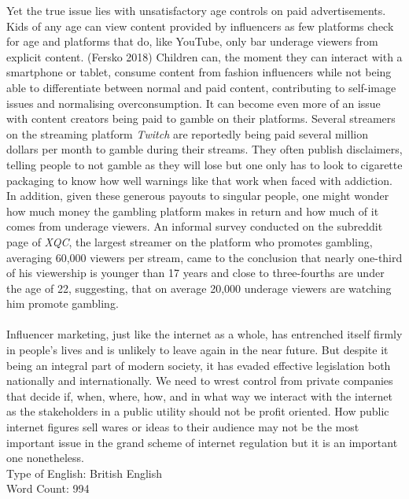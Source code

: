\documentclass{article}
\begin{document}
	Yet the true issue lies with unsatisfactory age controls on paid advertisements. Kids of any age can view content provided by influencers as few platforms check for age and platforms that do, like YouTube, only bar underage viewers from explicit content. (Fersko 2018) Children can, the moment they can interact with a smartphone or tablet, consume content from fashion influencers while not being able to differentiate between normal and paid content, contributing to self-image issues and normalising overconsumption. It can become even more of an issue with content creators being paid to gamble on their platforms. Several streamers on the streaming platform \textit{Twitch} are reportedly being paid several million dollars per month to gamble during their streams. They often publish disclaimers, telling people to not gamble as they will lose but one only has to look to cigarette packaging to know how well warnings like that work when faced with addiction. In addition, given these generous payouts to singular people, one might wonder how much money the gambling platform makes in return and how much of it comes from underage viewers. An informal survey conducted on the subreddit page of \textit{XQC}, the largest streamer on the platform who promotes gambling, averaging 60,000 viewers per stream, came to the conclusion that nearly one-third of his viewership is younger than 17 years and close to three-fourths are under the age of 22, suggesting, that on average 20,000 underage viewers are watching him promote gambling. \\ \\

	Influencer marketing, just like the internet as a whole, has entrenched itself firmly in people's lives and is unlikely to leave again in the near future. But despite it being an integral part of modern society, it has evaded effective legislation both nationally and internationally. We need to wrest control from private companies that decide if, when, where, how, and in what way we interact with the internet as the stakeholders in a public utility should not be profit oriented. How public internet figures sell wares or ideas to their audience may not be the most important issue in the grand scheme of internet regulation but it is an important one nonetheless. \\
	
	Type of English: British English \\
	Word Count: 994
	\newpage
	\endgroup
\end{document}
